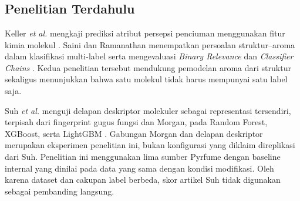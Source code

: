 \chapter{\babDua}

\section{Penelitian Terdahulu}

Keller \textit{et al.} mengkaji prediksi atribut persepsi penciuman menggunakan fitur kimia molekul \cite{keller2017}. Saini dan Ramanathan menempatkan persoalan struktur--aroma dalam klasifikasi multi-label serta mengevaluasi \textit{Binary Relevance} dan \textit{Classifier Chains} \cite{saini2022}. Kedua penelitian tersebut mendukung pemodelan aroma dari struktur sekaligus menunjukkan bahwa satu molekul tidak harus mempunyai satu label saja.

Suh \textit{et al.} menguji delapan deskriptor molekuler sebagai representasi tersendiri, terpisah dari fingerprint gugus fungsi dan Morgan, pada Random Forest, XGBoost, serta LightGBM \cite{suh2025}. Gabungan Morgan dan delapan deskriptor merupakan eksperimen penelitian ini, bukan konfigurasi yang diklaim direplikasi dari Suh. Penelitian ini menggunakan lima sumber Pyrfume dengan baseline internal yang dinilai pada data yang sama dengan kondisi modifikasi. Oleh karena dataset dan cakupan label berbeda, skor artikel Suh tidak digunakan sebagai pembanding langsung.


